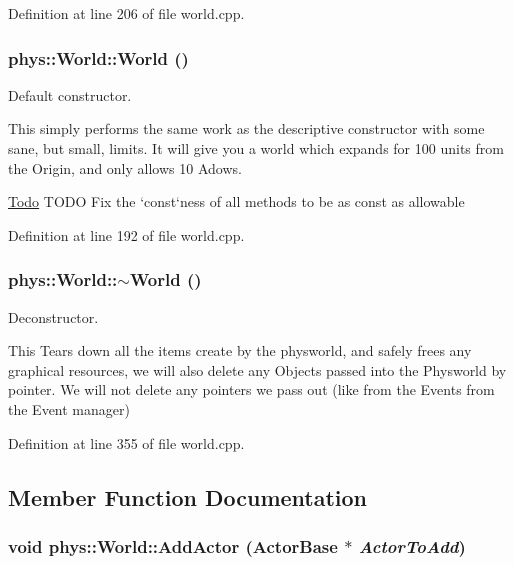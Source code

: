 Definition at line 206 of file world.cpp.

\hypertarget{classphys_1_1World_a7f762724406c874250c3dc8910a1e695}{
\subsubsection[{World}]{\setlength{\rightskip}{0pt plus 5cm}phys::World::World ()}}
\label{da/ddf/classphys_1_1World_a7f762724406c874250c3dc8910a1e695}


Default constructor. 

This simply performs the same work as the descriptive constructor with some sane, but small, limits. It will give you a world which expands for 100 units from the Origin, and only allows 10 Adows.

\begin{Desc}
\item[\hyperlink{todo__todo000014}{Todo}]TODO Fix the `const`ness of all methods to be as const as allowable \end{Desc}


Definition at line 192 of file world.cpp.

\hypertarget{classphys_1_1World_a8b2c74c7e5d5ce3c46a814e183a7aff1}{
\subsubsection[{$\sim$World}]{\setlength{\rightskip}{0pt plus 5cm}phys::World::$\sim$World ()}}
\label{da/ddf/classphys_1_1World_a8b2c74c7e5d5ce3c46a814e183a7aff1}


Deconstructor. 

This Tears down all the items create by the physworld, and safely frees any graphical resources, we will also delete any Objects passed into the Physworld by pointer. We will not delete any pointers we pass out (like from the Events from the Event manager) 

Definition at line 355 of file world.cpp.



\subsection{Member Function Documentation}
\hypertarget{classphys_1_1World_a0fec41ef68b7bb1443aab927f8277a81}{
\subsubsection[{AddActor}]{\setlength{\rightskip}{0pt plus 5cm}void phys::World::AddActor ({\bf ActorBase} $\ast$ {\em ActorToAdd})}}
\label{da/ddf/classphys_1_1World_a0fec41ef68b7bb1443aab927f8277a81}


